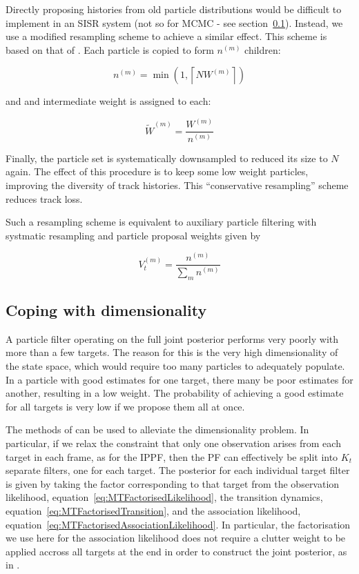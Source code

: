 Directly proposing histories from old particle distributions would be difficult to implement in an SISR system (not so for MCMC - see section~\ref{}). Instead, we use a modified resampling scheme to achieve a similar effect. This scheme is based on that of \cite{Godsill2007}. Each particle is copied to form $n^{(m)}$ children:

\begin{equation}
n^{(m)} = \min(1,\left\lceil N W^{(m)} \right\rceil)
\label{eq:}
\end{equation}

and and intermediate weight is assigned to each:

\begin{equation}
\tilde{W}^{(m)} = \frac{W^{(m)}}{n^{(m)}}
\label{eq:}
\end{equation}

Finally, the particle set is systematically downsampled to reduced its size to $N$ again. The effect of this procedure is to keep some low weight particles, improving the diversity of track histories. This ``conservative resampling'' scheme reduces track loss.

Such a resampling scheme is equivalent to auxiliary particle filtering with systmatic resampling and particle proposal weights given by

\begin{equation}
V_t^{(m)} = \frac{n^{(m)}}{\sum_m n^{(m)}}
\label{eq:}
\end{equation}



\subsection{Coping with dimensionality}
A particle filter operating on the full joint posterior performs very poorly with more than a few targets. The reason for this is the very high dimensionality of the state space, which would require too many particles to adequately populate. In a particle with good estimates for one target, there many be poor estimates for another, resulting in a low weight. The probability of achieving a good estimate for all targets is very low if we propose them all at once.

The methods of \cite{Vermaak2005} can be used to alleviate the dimensionality problem. In particular, if we relax the constraint that only one observation arises from each target in each frame, as for the IPPF, then the PF can effectively be split into $K_t$ separate filters, one for each target. The posterior for each individual target filter is given by taking the factor corresponding to that target from the observation likelihood, equation~\ref{eq:MTFactorisedLikelihood}, the transition dynamics, equation~\ref{eq:MTFactorisedTransition}, and the association likelihood, equation~\ref{eq:MTFactorisedAssociationLikelihood}. In particular, the factorisation we use here for the association likelihood does not require a clutter weight to be applied accross all targets at the end in order to construct the joint posterior, as in \cite{Vermaak2005}.

